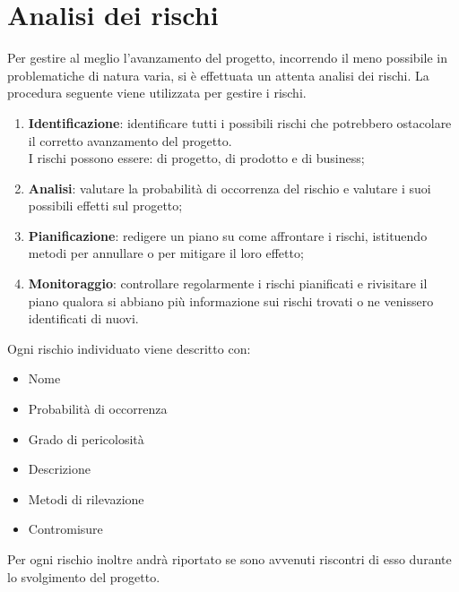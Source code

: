 %
%


\section{Analisi dei rischi} %
\label{sec:analisi_dei_rischi}
Per gestire al meglio l'avanzamento del progetto, incorrendo il meno possibile in problematiche di natura varia, si è effettuata un attenta analisi dei rischi. La procedura seguente viene utilizzata per gestire i rischi.
	\begin{enumerate}
		\item \textbf{Identificazione}: identificare tutti i possibili rischi che potrebbero ostacolare il corretto avanzamento del progetto. \\
		I rischi possono essere: di progetto, di prodotto e di business;
		\item \textbf{Analisi}: valutare la probabilità di occorrenza del rischio e valutare i suoi possibili effetti sul progetto;
		\item \textbf{Pianificazione}: redigere un piano su come affrontare i rischi, istituendo metodi per annullare o per mitigare il loro effetto;
		\item \textbf{Monitoraggio}: controllare regolarmente i rischi pianificati e rivisitare il piano qualora si abbiano più informazione sui rischi trovati o ne venissero identificati di nuovi.
	\end{enumerate}
\noindent
Ogni rischio individuato viene descritto con: 
	\begin{itemize}
		\item Nome
		\item Probabilità di occorrenza
		\item Grado di pericolosità
		\item Descrizione
		\item Metodi di rilevazione
		\item Contromisure
	\end{itemize}
\noindent
Per ogni rischio inoltre andrà riportato se sono avvenuti riscontri di esso durante lo svolgimento del progetto.

